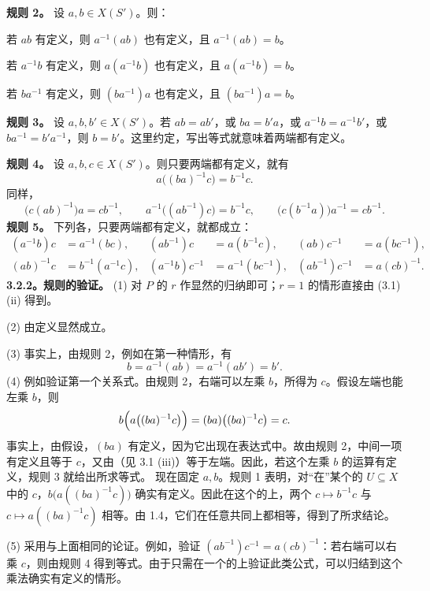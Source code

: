 \textbf{规则 2。} 设 $a,b\in X(S')$。则：

若 $ab$ 有定义，则 $a^{-1}(ab)$ 也有定义，且 $a^{-1}(ab)=b$。

若 $a^{-1}b$ 有定义，则 $a(a^{-1}b)$ 也有定义，且 $a(a^{-1}b)=b$。

若 $ba^{-1}$ 有定义，则 $(ba^{-1})a$ 也有定义，且 $(ba^{-1})a=b$。

\textbf{规则 3。} 设 $a,b,b'\in X(S')$。若 $ab=ab'$，或 $ba=b'a$，或 $a^{-1}b=a^{-1}b'$，或 $ba^{-1}=b'a^{-1}$，则 $b=b'$。这里约定，写出等式就意味着两端都有定义。

\textbf{规则 4。} 设 $a,b,c\in X(S')$。则只要两端都有定义，就有
\[
a\bigl((ba)^{-1}c\bigr)=b^{-1}c.
\]
同样，
\[
\bigl(c(ab)^{-1}\bigr)a=cb^{-1},\qquad
 a^{-1}\bigl((ab^{-1})c\bigr)=b^{-1}c,\qquad
 \bigl(c(b^{-1}a)\bigr)a^{-1}=cb^{-1}.
\]
\textbf{规则 5。} 下列各，只要两端都有定义，就都成立：
\[
\begin{aligned}
(a^{-1}b)c&=a^{-1}(bc),& (ab^{-1})c&=a(b^{-1}c),& (ab)c^{-1}&=a(bc^{-1}),\\
(ab)^{-1}c&=b^{-1}(a^{-1}c),& (a^{-1}b)c^{-1}&=a^{-1}(bc^{-1}),& (ab^{-1})c^{-1}&=a(cb)^{-1}.
\end{aligned}
\]
\textbf{3.2.2。规则的验证。} (1) 对 $P$ 的 $r$ 作显然的归纳即可；$r=1$ 的情形直接由 (3.1) (ii) 得到。

(2) 由定义显然成立。

(3) 事实上，由规则 2，例如在第一种情形，有
\[
b=a^{-1}(ab)=a^{-1}(ab')=b'.
\]
(4) 例如验证第一个关系式。由规则 2，右端可以左乘 $b$，所得为 $c$。假设左端也能左乘 $b$，则
\[
b\Bigl(a\bigl((ba)^{-1}c\bigr)\Bigr)=(ba)\bigl((ba)^{-1}c\bigr)=c.
\]
事实上，由假设，$(ba)$ 有定义，因为它出现在表达式中。故由规则 2，中间一项有定义且等于 $c$，又由（见 3.1 (iii)）等于左端。因此，若这个左乘 $b$ 的运算有定义，规则 3 就给出所求等式。
现在固定 $a,b$。规则 1 表明，对“在”某个的 $U\subseteq X$ 中的 $c$，$b\bigl(a((ba)^{-1}c)\bigr)$ 确实有定义。因此在这个的上，两个 $c\mapsto b^{-1}c$ 与 $c\mapsto a((ba)^{-1}c)$ 相等。由 1.4，它们在任意共同上都相等，得到了所求结论。

(5) 采用与上面相同的论证。例如，验证 $(ab^{-1})c^{-1}=a(cb)^{-1}$：若右端可以右乘 $c$，则由规则 4 得到等式。由于只需在一个的上验证此类公式，可以归结到这个乘法确实有定义的情形。

